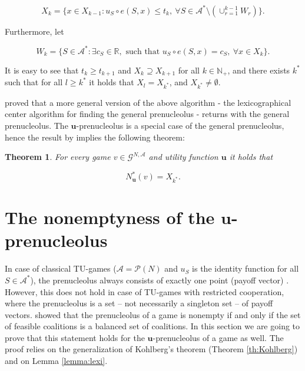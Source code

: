 \documentclass[a4paper,12pt]{article}
\newtheorem{theorem}{Theorem}
\theoremstyle{definition}
\theoremstyle{remark}
\begin{document}
\begin{equation*}
X_k = \{ x \in X_{k-1} \colon u_S \circ e(S,x) \leq t_k, \  \forall S \in \mathcal{A}^\ast \setminus (\cup_{r=1}^{k-1} W_r) \} .
\end{equation*}

\noindent Furthermore, let

\begin{equation*}
W_k = \{ S \in \mathcal{A}^\ast \colon \exists c_S \in \mathbb{R}, \text{ such that } u_S \circ e(S,x) = c_S,\ \forall x \in X_k \} .
\end{equation*}

It is easy to see that $t_k \geq t_{k+1}$ and $X_k \supseteq X_{k+1}$ for all $k \in \mathbb{N}_+$, and there exists $k^*$ such that for all $l\geq k^*$ it holds that $X_l = X_{k^*}$, and $X_{k^*} \neq \emptyset$.

\bigskip

\citet{MaschlerPottersTijs1992} proved that a more general version of the above algorithm - the lexicographical center algorithm for finding the general prenucleolus - returns with the general prenucleolus. The $\mathbf{u}$-prenucleolus is a special case of the general prenucleolus, hence the result by \citet{MaschlerPottersTijs1992} implies the following theorem:

\begin{theorem}\label{thm:charupren}
For every game $v \in \mathcal{G}^{N,\mathcal{A}}$ and utility function $\mathbf{u}$ it holds that

\begin{equation*}
N_{\mathbf{u}}^\ast (v) = X_{k^\ast}.
\end{equation*}
\end{theorem}


\section{The nonemptyness of the $\mathbf{u}$-prenucleolus}\label{sec:existence}

In case of classical TU-games ($\mathcal{A} = \mathcal{P}(N)$ and $u_S$ is the identity function for all $S \in \mathcal{A}^*$), the prenucleolus always consists of exactly one point (payoff vector) \citep{Schmeidler1967}. However, this does not hold in case of TU-games with restricted cooperation, where the prenucleolus is a set -- not necessarily a singleton set -- of payoff vectors. \citet{Katsev2013} showed that the prenucleolus of a game is nonempty if and only if the set of feasible coalitions is a balanced set of coalitions. In this section we are going to prove that this statement holds for the $\mathbf{u}$-prenucleolus of a game as well. The proof relies on the generalization of Kohlberg's theorem (Theorem \ref{th:Kohlberg}) and on Lemma \ref{lemma:lexi}.
\end{document}
